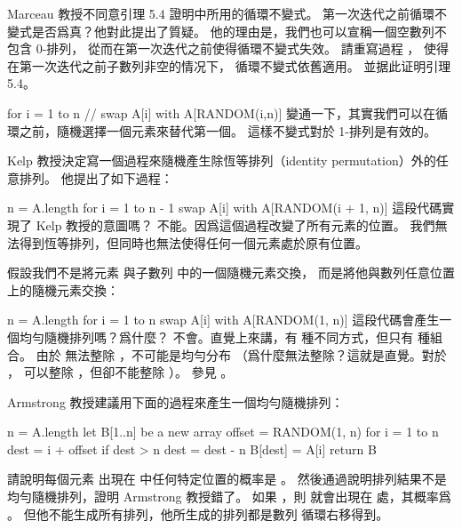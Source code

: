 \startsection[
  title={Randomized algorithms},
]

\startEXERCISE
Marceau 教授不同意引理 5.4 證明中所用的循環不變式。
第一次迭代之前循環不變式是否爲真？他對此提出了質疑。
他的理由是，我們也可以宣稱一個空數列不包含 0-排列，
從而在第一次迭代之前使得循環不變式失效。
請重寫過程 ，
使得在第一次迭代之前子數列非空的情况下，
循環不變式依舊適用。
並据此证明引理 5.4。


\startCLRSCODE
for i = 1 to n
	// swap A[i] with A[RANDOM(i,n)]
\stopCLRSCODE
\stopEXERCISE
\startANSWER
變通一下，其實我們可以在循環之前，隨機選擇一個元素來替代第一個。
這樣不變式對於 1-排列是有效的。
\stopANSWER

\startEXERCISE
Kelp 教授決定寫一個過程來隨機產生除恆等排列（identity permutation）外的任意排列。
他提出了如下過程：

\startCLRS
n = A.length
for i = 1 to n - 1
	swap A[i] with A[RANDOM(i + 1, n)]
\stopCLRS
這段代碼實現了 Kelp 教授的意圖嗎？
\stopEXERCISE
\startANSWER
不能。因爲這個過程改變了所有元素的位置。
我們無法得到恆等排列，但同時也無法使得任何一個元素處於原有位置。
\stopANSWER

\startEXERCISE
假設我們不是將元素  與子數列  中的一個隨機元素交換，
而是將他與數列任意位置上的隨機元素交換：

\startCLRS
n = A.length
for i = 1 to n
	swap A[i] with A[RANDOM(1, n)]
\stopCLRS
這段代碼會產生一個均勻隨機排列嗎？爲什麼？
\stopEXERCISE
\startANSWER
不會。直覺上來講，有  種不同方式，但只有  種組合。
由於  無法整除 ，不可能是均勻分布
（爲什麼無法整除？這就是直覺。對於 ，  可以整除 ，但卻不能整除 ）。
參見 。
\stopANSWER

\startEXERCISE
Armstrong 教授建議用下面的過程來產生一個均勻隨機排列：

\startCLRS
n = A.length
let B[1..n] be a new array
offset = RANDOM(1, n)
for i = 1 to n
	dest = i + offset
	if dest > n
		dest = dest - n
	B[dest] = A[i]
return B
\stopCLRS

請說明每個元素  出現在  中任何特定位置的概率是 。
然後通過說明排列結果不是均勻隨機排列，證明 Armstrong 教授錯了。
\stopEXERCISE
\startANSWER
如果 ，則  就會出現在  處，其概率爲 。
但他不能生成所有排列，他所生成的排列都是數列  循環右移得到。
\stopANSWER

